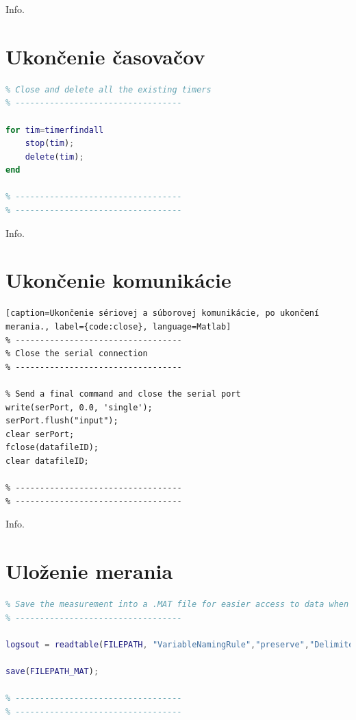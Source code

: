 \documentclass[a4paper, 10pt, ]{article}
\begin{document}
Info.

\section{Ukončenie časovačov}
\begin{lstlisting}[caption=Ukončenie a odstránenie všetkých aktívnych Matlab časovačov., label={code:timer_end}, language=Matlab]
% ----------------------------------
% Close and delete all the existing timers
% ----------------------------------

for tim=timerfindall
    stop(tim);
    delete(tim);
end

% ----------------------------------
% ----------------------------------
\end{lstlisting}

Info.

\section{Ukončenie komunikácie}
\begin{lstlisting}[caption=Ukončenie sériovej a súborovej komunikácie, po ukončení merania., label={code:close}, language=Matlab]
% ----------------------------------
% Close the serial connection
% ----------------------------------

% Send a final command and close the serial port
write(serPort, 0.0, 'single');
serPort.flush("input");
clear serPort;
fclose(datafileID);
clear datafileID;

% ----------------------------------
% ----------------------------------
\end{lstlisting}

Info.

\section{Uloženie merania}
\begin{lstlisting}[caption=Ukladanie meracích dát do csv a mat súborov., label={code:save}, language=Matlab]
% ----------------------------------
% Save the measurement into a .MAT file for easier access to data when using Matlab
% ----------------------------------

logsout = readtable(FILEPATH, "VariableNamingRule","preserve","Delimiter",",");

save(FILEPATH_MAT);

% ----------------------------------
% ----------------------------------
\end{lstlisting}
\end{document}
